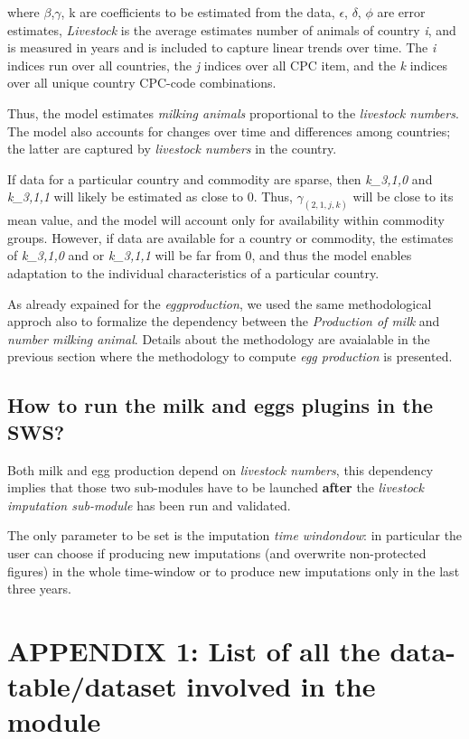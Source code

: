 \documentclass[nojss]{jss}
\begin{document}
where $\beta$,$\gamma$, k are coefficients to be estimated from the data, $\epsilon$, $\delta$, $\phi$ are error estimates, \textit{Livestock} is the average estimates number of animals of country \textit{i}, and  is measured in years and is included to capture linear trends over time. The \textit{i} indices run over all countries, the \textit{j} indices over all CPC item, and the \textit{k} indices over all unique country CPC-code combinations.

Thus, the model estimates \textit{milking animals} proportional to the \textit{livestock numbers}. The model also accounts for changes over time and differences among countries; the latter are captured by \textit{livestock numbers} in the country.

If data for a particular country and commodity are sparse, then \textit{k_3,1,0}  and \textit{k_3,1,1} will likely be estimated as close to 0. Thus, $\gamma_(2,1,j,k)$ will be close to its mean value, and the model will account only for availability within commodity groups. However, if data are available for a country or commodity, the estimates of \textit{k_3,1,0} and or \textit{k_3,1,1} will be far from 0, and thus the model enables adaptation to the individual characteristics of a particular country.


As already expained for the \textit{eggproduction}, we used the same methodological approch also to formalize the dependency between the \textit{Production of milk} and \textit{number milking animal}. Details about the methodology are avaialable in the previous section where the methodology to compute \textit{egg production} is presented.

\subsection{How to run the milk and eggs plugins in the SWS?}

Both milk and egg production depend on \textit{livestock numbers}, this dependency implies that those two sub-modules have to be launched \textbf{after} the \textit{livestock imputation sub-module} has been run and validated.

The only parameter to be set is the imputation \textit{time windondow}: in particular the user can choose if producing new imputations (and overwrite non-protected figures) in the whole time-window or to produce new imputations only in the last three years.

\section{APPENDIX 1: List of all the data-table/dataset involved in the module}
\end{document}
